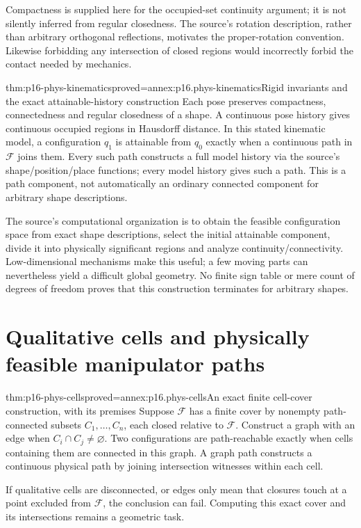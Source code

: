 Compactness is supplied here for the occupied-set continuity argument;
it is not silently inferred from regular closedness. The source's rotation
description, rather than arbitrary orthogonal reflections, motivates the
proper-rotation convention. Likewise forbidding any intersection of closed
regions would incorrectly forbid the contact needed by mechanics.

\begin{hbtheorem}{thm:p16-phys-kinematics}{proved=annex:p16.phys-kinematics}{Rigid invariants and the exact attainable-history construction}
Each pose preserves compactness, connectedness and regular closedness of a
shape. A continuous pose history gives continuous occupied regions in
Hausdorff distance. In this stated kinematic model, a configuration \(q_1\)
is attainable from \(q_0\) exactly when a continuous path in
\(\mathcal F\) joins them. Every such path constructs a full model
history via the source's shape/position/place functions; every model history
gives such a path. This is a path component, not automatically an ordinary
connected component for arbitrary shape descriptions.
\end{hbtheorem}

The source's computational organization is to obtain the feasible
configuration space from exact shape descriptions, select the initial
attainable component, divide it into physically significant regions and
analyze continuity/connectivity. Low-dimensional mechanisms make this useful;
a few moving parts can nevertheless yield a difficult global geometry.
No finite sign table or mere count of degrees of freedom proves that this
construction terminates for arbitrary shapes.

\section{Qualitative cells and physically feasible manipulator paths}
\label{sec:p16-phys-cells-actions}

\begin{hbtheorem}{thm:p16-phys-cells}{proved=annex:p16.phys-cells}{An exact finite cell-cover construction, with its premises}
Suppose \(\mathcal F\) has a finite cover by nonempty path-connected
subsets \(C_1,\ldots,C_n\), each closed relative to \(\mathcal F\).
Construct a graph with an edge when \(C_i\cap C_j\ne\varnothing\).
Two configurations are path-reachable exactly when cells containing them
are connected in this graph. A graph path constructs a continuous physical
path by joining intersection witnesses within each cell.

If qualitative cells are disconnected, or edges only mean that closures
touch at a point excluded from \(\mathcal F\), the conclusion can fail.
Computing this exact cover and its intersections remains a geometric task.
\end{hbtheorem}

